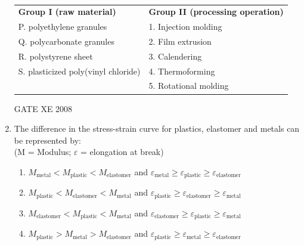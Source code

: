 \documentclass[12pt]{article}
\begin{document}
\begin{enumerate}[label=Q\arabic*.]
\begin{table}[H]     \centering     \caption{}     \label{}     \begin{tabular}{l l}
\textbf{Group I (raw material)} & \textbf{Group II (processing operation)} \\
P. polyethylene granules & 1. Injection molding \\
Q. polycarbonate granules & 2. Film extrusion \\
R. polystyrene sheet & 3. Calendering \\
S. plasticized poly(vinyl chloride) & 4. Thermoforming \\
& 5. Rotational molding \\
\end{tabular} \end{table}

\begin{enumerate}[label=(\Alph*)]
\end{enumerate}

GATE XE 2008

\item The difference in the stress-strain curve for plastics, elastomer and metals can be represented by: \\
(M = Modulus; $\varepsilon$ = elongation at break)

\begin{enumerate}[label=(\Alph*)]
\item  $M_{\text{metal}} < M_{\text{plastic}} < M_{\text{elastomer}}$ and $\varepsilon_{\text{metal}} \geq \varepsilon_{\text{plastic}} \geq \varepsilon_{\text{elastomer}}$ 
\item  $M_{\text{plastic}} < M_{\text{elastomer}} < M_{\text{metal}}$ and $\varepsilon_{\text{plastic}} \geq \varepsilon_{\text{elastomer}} \geq \varepsilon_{\text{metal}}$ 
\item  $M_{\text{elastomer}} < M_{\text{plastic}} < M_{\text{metal}}$ and $\varepsilon_{\text{elastomer}} \geq \varepsilon_{\text{plastic}} \geq \varepsilon_{\text{metal}}$ 
\item  $M_{\text{plastic}} > M_{\text{metal}} > M_{\text{elastomer}}$ and $\varepsilon_{\text{plastic}} \geq \varepsilon_{\text{metal}} \geq \varepsilon_{\text{elastomer}}$
\end{enumerate}


\end{enumerate}
\end{document}
